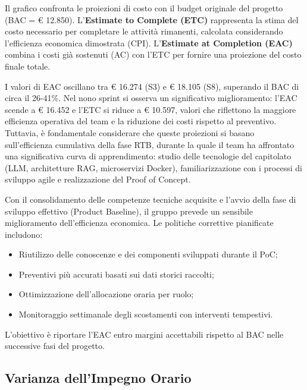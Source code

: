 \documentclass[a4paper,11pt,oneside]{scrartcl}
\begin{document}
Il grafico confronta le proiezioni di costo con il budget originale del progetto (BAC = \euro{} 12.850). L'\textbf{Estimate to Complete (ETC)} rappresenta la stima del costo necessario per completare le attività rimanenti, calcolata considerando l'efficienza economica dimostrata (CPI). L'\textbf{Estimate at Completion (EAC)} combina i costi già sostenuti (AC) con l'ETC per fornire una proiezione del costo finale totale.

I valori di EAC oscillano tra \euro{} 16.274 (S3) e \euro{} 18.105 (S8), superando il BAC di circa il 26-41\%. Nel nono sprint si osserva un significativo miglioramento: l'EAC scende a \euro{} 16.452 e l'ETC si riduce a \euro{} 10.597, valori che riflettono la maggiore efficienza operativa del team e la riduzione dei costi rispetto al preventivo. Tuttavia, è fondamentale considerare che queste proiezioni si basano sull'efficienza cumulativa della fase RTB, durante la quale il team ha affrontato una significativa curva di apprendimento: studio delle tecnologie del capitolato (LLM, architetture RAG, microservizi Docker{\scriptsize{}}), familiarizzazione con i processi di sviluppo agile e realizzazione del Proof of Concept.

Con il consolidamento delle competenze tecniche acquisite e l'avvio della fase di sviluppo effettivo (Product Baseline{\scriptsize{}}), il gruppo prevede un sensibile miglioramento dell'efficienza economica. Le politiche correttive pianificate includono:
\begin{itemize}
    \item Riutilizzo delle conoscenze e dei componenti sviluppati durante il PoC;
    \item Preventivi più accurati basati sui dati storici raccolti;
    \item Ottimizzazione dell'allocazione oraria per ruolo;
    \item Monitoraggio settimanale degli scostamenti con interventi tempestivi.
\end{itemize}

L'obiettivo è riportare l'EAC entro margini accettabili rispetto al BAC nelle successive fasi del progetto.

\subsection{Varianza dell'Impegno Orario}
\end{document}

